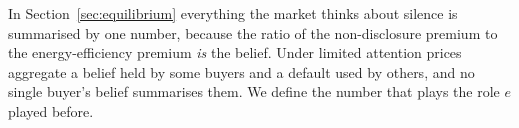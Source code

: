 In Section~\ref{sec:equilibrium} everything the market thinks about silence is summarised by one number, because the ratio of the non-disclosure premium to the energy-efficiency premium \emph{is} the belief. Under limited attention prices aggregate a belief held by some buyers and a default used by others, and no single buyer's belief summarises them. We define the number that plays the role $e$ played before.
